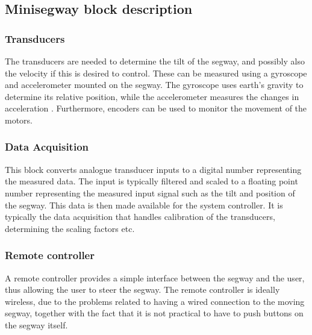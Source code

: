 \subsection{Minisegway block description}
\subsubsection{Transducers}
The transducers are needed to determine the tilt of the segway, and possibly also the velocity if this is desired to control. These can be measured using a gyroscope and accelerometer mounted on the segway. The gyroscope uses earth's gravity to determine its relative position, while the accelerometer measures the changes in acceleration \citep{acc_vs_gyro} . Furthermore, encoders can be used to monitor the movement of the motors. 

\subsubsection{Data Acquisition}
This block converts analogue transducer inputs to a digital number representing the measured data. The input is typically filtered and scaled to a floating point number representing the measured input signal such as the tilt and position of the segway. This data is then made available for the system controller. It is typically the data acquisition that handles calibration of the transducers, determining the scaling factors etc.


\subsubsection{Remote controller}
A remote controller provides a simple interface between the segway and the user, thus allowing the user to steer the segway. The remote controller is ideally wireless, due to the problems related to having a wired connection to the moving segway, together with the fact that it is not practical to have to push buttons on the segway itself.

